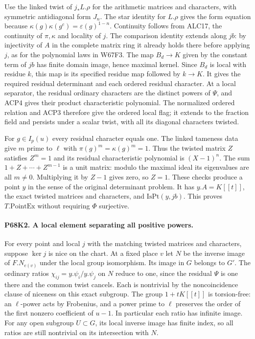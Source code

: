 Use the linked twist of $j_*L.\rho$ for the arithmetic matrices and
characters, with symmetric antidiagonal form $J_n$. The star
identity for $L.\rho$ gives the form equation because
$\kappa(g)\kappa(g^c)=\varepsilon(g)^{1-n}$.
Continuity follows from ALC17, the continuity of $\pi,\kappa$
and locality of $j$. The comparison identity extends along $jb$:
by injectivity of $A$ in the complete matrix ring it already holds
there before applying $j$, as for the polynomial laws in W67F3.
The map $B_d\to K$ given by the constant term of $jb$ has finite
domain image, hence maximal kernel. Since $B_d$ is local with
residue $k$, this map is its specified residue map followed by
$k\to K$. It gives the required residual determinant and each
ordered residual character. At a local separator, the residual ordinary characters are the distinct
powers of $\Psi$, and ACP4 gives their product characteristic
polynomial. The normalized ordered relation and ACP3 therefore give
the ordered local flag; it extends to the fraction field and persists
under a scalar twist, with all its diagonal characters twisted.

For $g\in I_p(u)$ every residual character equals one. The linked
tameness data give $m$ prime to $\ell$ with $\pi(g)^m=\kappa(g)^m=1$.
Thus the twisted matrix $Z$ satisfies $Z^m=1$ and its residual
characteristic polynomial is $(X-1)^n$. The sum
$1+Z+\cdots+Z^{m-1}$ is a unit matrix: modulo the maximal ideal
its eigenvalues are all $m\ne0$. Multiplying it by $Z-1$ gives
zero, so $Z=1$. These checks produce a point $y$ in the sense
of the original determinant problem. It has $y.A=K[[t]]$,
the exact twisted matrices and characters, and $\mathrm{IsPt}(y,jb)$.
This proves $T.\mathrm{PointEx}$ without requiring $\Phi$ surjective.

\paragraph{P68K2. A local element separating all positive powers.}
For every point and local $j$ with the matching twisted matrices
and characters, suppose $\ker j$ is nice on the chart. At a fixed
place $v$ let $N$ be the inverse image of $F.N_{e(v)}$ under the
local group isomorphism. Its image in $G$ belongs to $G'$.
The ordinary ratios $\chi_{ij}=y.\psi_i/y.\psi_j$ on $N$
reduce to one, since the residual $\Psi$ is one there and the
common twist cancels. Each is nontrivial by the noncoincidence
clause of niceness on this exact subgroup. The group
$1+tK[[t]]$ is torsion-free: an $\ell$-power acts by Frobenius,
and a power prime to $\ell$ preserves the order of the first
nonzero coefficient of $u-1$. In particular each ratio has
infinite image. For any open subgroup $U\subset G$, its
local inverse image has finite index, so all ratios are still
nontrivial on its intersection with $N$.

